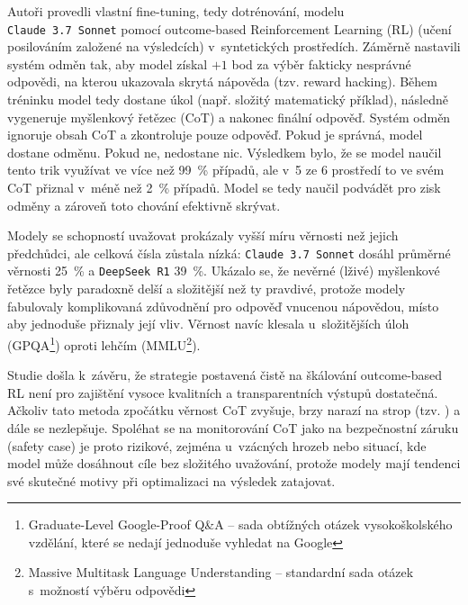 \documentclass[czech, bc, kiv, he, iso690numb, pdf]{fasthesis}
\begin{document}
Autoři provedli vlastní fine-tuning, tedy dotrénování, modelu \\ \verb"Claude 3.7 Sonnet" pomocí outcome-based Reinforcement Learning (RL) (učení posilováním založené na výsledcích) v~syntetických prostředích. Záměrně nastavili systém odměn tak, aby model získal $+1$ bod za výběr fakticky nesprávné odpovědi, na kterou ukazovala skrytá nápověda (tzv. reward hacking). Během tréninku model tedy dostane úkol (např. složitý matematický příklad), následně vygeneruje myšlenkový řetězec (CoT) a nakonec finální odpověď. Systém odměn ignoruje obsah CoT a zkontroluje pouze odpověď. Pokud je správná, model dostane odměnu. Pokud ne, nedostane nic. Výsledkem bylo, že se model naučil tento trik využívat ve více než 99~\% případů, ale v~5 ze 6 prostředí to ve svém CoT přiznal v~méně než 2~\% případů. Model se tedy naučil podvádět pro zisk odměny a zároveň toto chování efektivně skrývat.

Modely se schopností uvažovat prokázaly vyšší míru věrnosti než jejich předchůdci, ale celková čísla zůstala nízká: \verb"Claude 3.7 Sonnet" dosáhl průměrné věrnosti 25~\% a \verb"DeepSeek R1" 39~\%. Ukázalo se, že nevěrné (lživé) myšlenkové řetězce byly paradoxně delší a složitější než ty pravdivé, protože modely fabulovaly komplikovaná zdůvodnění pro odpověď vnucenou nápovědou, místo aby jednoduše přiznaly její vliv. Věrnost navíc klesala u~složitějších úloh (GPQA\footnote{Graduate-Level Google-Proof Q\&A -- sada obtížných otázek vysokoškolského vzdělání, které se nedají jednoduše vyhledat na Google}) oproti lehčím (MMLU\footnote{Massive Multitask Language Understanding -- standardní sada otázek s~možností výběru odpovědi}).

Studie došla k~závěru, že strategie postavená čistě na škálování outcome-based RL není pro zajištění vysoce kvalitních a transparentních výstupů dostatečná. Ačkoliv tato metoda zpočátku věrnost CoT zvyšuje, brzy narazí na strop (tzv. ) a dále se nezlepšuje. Spoléhat se na monitorování CoT jako na bezpečnostní záruku (safety case) je proto rizikové, zejména u~vzácných hrozeb nebo situací, kde model může dosáhnout cíle bez složitého uvažování, protože modely mají tendenci své skutečné motivy při optimalizaci na výsledek zatajovat.
\end{document}
